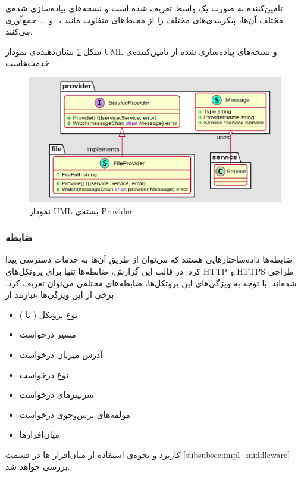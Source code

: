 تامین‌کننده به صورت یک واسط تعریف شده است و نسخه‌های پیاده‌سازی شده‌ی مختلف ‌آن‌ها، پیکربندی‌های مختلف را از محیط‌های متفاوت مانند ، ‌ و ... جمع‌آوری می‌کنند.

شکل
\ref{provider}
نشان‌دهنده‌ی نمودار UML و نسخه‌های پیاده‌سازی شده از تامین‌کننده‌ی خدمت‌هاست.

\begin{figure}[H]
    \centering
    \label{provider}
    \includegraphics[scale=0.2]{images/Provider.png}
    \caption{نمودار UML بسته‌ی Provider}
\end{figure}

\subsubsection{ضابطه}
ضابطه‌ها داده‌ساختار‌هایی هستند که می‌توان از طریق آن‌ها به خدمات دسترسی پیدا کرد. در قالب این گزارش، ضابطه‌ها تنها برای پروتکل‌های HTTP و HTTPS طراحی شده‌اند. با توجه به ویژگی‌های این پروتکل‌ها، ضابطه‌های مختلفی می‌توان تعریف کرد. برخی از این ویژگی‌ها عبارتند از:

\begin{itemize}
    \item نوع پروتکل ( یا )
    \item مسیر درخواست 
    \item آدرس میزبان درخواست 
    \item نوع درخواست 
    \item سرتیتر‌های درخواست 
    \item مولفه‌های پرس‌و‌جوی درخواست 
    \item میان‌افزار‌ها
\end{itemize}

کاربرد و نحوه‌ی استفاده از میان‌افزار ها در قسمت
\ref{subsubsec:impl_middleware}
بررسی خواهد شد.


